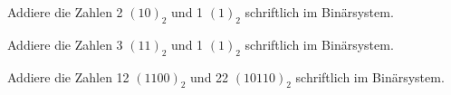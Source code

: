 \begin{exerciseseries}[columns=1,solsubrule=\hrule]{}
    \begin{exercise}
        Addiere die Zahlen 2 $(10)_2$ und 1 $(1)_2$ schriftlich im Binärsystem.
        \vspace{5cm}
    \end{exercise}
    \begin{solution}
    \end{solution}
    \begin{exercise}
        Addiere die Zahlen 3 $(11)_2$ und 1 $(1)_2$ schriftlich im Binärsystem.
        \vspace{5cm}
    \end{exercise}
    \begin{solution}
    \end{solution}
    \begin{exercise}
        Addiere die Zahlen 12 $(1100)_2$ und 22 $(10110)_2$ schriftlich im Binärsystem.
        \vspace{5cm}
    \end{exercise}
    \begin{solution}
    \end{solution}
\end{exerciseseries}

\newpage
\subsection{\solutionsname}
\loadSolutions